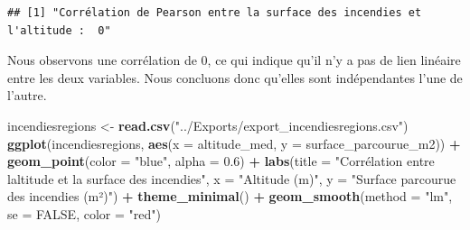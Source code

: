 \documentclass[
]{article}
\newenvironment{Shaded}{\begin{snugshade}}{\end{snugshade}}
\newcommand{\AttributeTok}[1]{\textcolor[rgb]{0.13,0.29,0.53}{#1}}
\newcommand{\ConstantTok}[1]{\textcolor[rgb]{0.56,0.35,0.01}{#1}}
\newcommand{\DecValTok}[1]{\textcolor[rgb]{0.00,0.00,0.81}{#1}}
\newcommand{\FloatTok}[1]{\textcolor[rgb]{0.00,0.00,0.81}{#1}}
\newcommand{\FunctionTok}[1]{\textcolor[rgb]{0.13,0.29,0.53}{\textbf{#1}}}
\newcommand{\NormalTok}[1]{#1}
\newcommand{\OtherTok}[1]{\textcolor[rgb]{0.56,0.35,0.01}{#1}}
\newcommand{\SpecialCharTok}[1]{\textcolor[rgb]{0.81,0.36,0.00}{\textbf{#1}}}
\newcommand{\StringTok}[1]{\textcolor[rgb]{0.31,0.60,0.02}{#1}}
\begin{document}
\begin{Shaded}
\end{Shaded}

\begin{verbatim}
## [1] "Corrélation de Pearson entre la surface des incendies et l'altitude :  0"
\end{verbatim}

Nous observons une corrélation de 0, ce qui indique qu'il n'y a pas de
lien linéaire entre les deux variables. Nous concluons donc qu'elles
sont indépendantes l'une de l'autre.

\begin{Shaded}
\begin{Highlighting}[]
\NormalTok{incendiesregions }\OtherTok{\textless{}{-}} \FunctionTok{read.csv}\NormalTok{(}\StringTok{"../Exports/export\_incendiesregions.csv"}\NormalTok{)}
\FunctionTok{ggplot}\NormalTok{(incendiesregions, }\FunctionTok{aes}\NormalTok{(}\AttributeTok{x =}\NormalTok{ altitude\_med, }\AttributeTok{y =}\NormalTok{ surface\_parcourue\_m2)) }\SpecialCharTok{+}
  \FunctionTok{geom\_point}\NormalTok{(}\AttributeTok{color =} \StringTok{"blue"}\NormalTok{, }\AttributeTok{alpha =} \FloatTok{0.6}\NormalTok{) }\SpecialCharTok{+}
  \FunctionTok{labs}\NormalTok{(}\AttributeTok{title =} \StringTok{"Corrélation entre l\textquotesingle{}altitude et la surface des incendies"}\NormalTok{,}
       \AttributeTok{x =} \StringTok{"Altitude (m)"}\NormalTok{, }\AttributeTok{y =} \StringTok{"Surface parcourue des incendies (m²)"}\NormalTok{) }\SpecialCharTok{+}
  \FunctionTok{theme\_minimal}\NormalTok{() }\SpecialCharTok{+}
  \FunctionTok{geom\_smooth}\NormalTok{(}\AttributeTok{method =} \StringTok{"lm"}\NormalTok{, }\AttributeTok{se =} \ConstantTok{FALSE}\NormalTok{, }\AttributeTok{color =} \StringTok{"red"}\NormalTok{)}
\end{Highlighting}
\end{Shaded}
\end{document}
